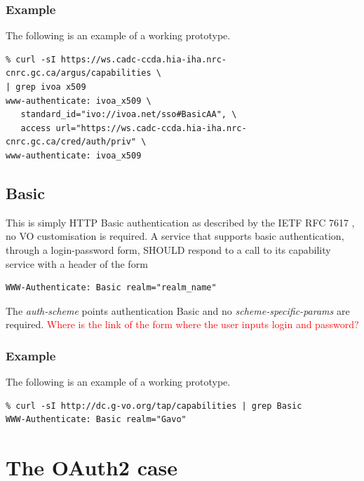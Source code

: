 \documentclass[11pt,a4paper]{ivoa}
\begin{document}
\subsubsection{Example}
The following is an example of a working prototype.
\begin{verbatim}
% curl -sI https://ws.cadc-ccda.hia-iha.nrc-cnrc.gc.ca/argus/capabilities \
| grep ivoa x509
www-authenticate: ivoa_x509 \
   standard_id="ivo://ivoa.net/sso#BasicAA", \ 
   access url="https://ws.cadc-ccda.hia-iha.nrc-cnrc.gc.ca/cred/auth/priv" \
www-authenticate: ivoa_x509
\end{verbatim}

\subsection{Basic}
This is simply HTTP Basic authentication as described by 
the IETF RFC 7617 \citep{rfc7617}, no VO customisation is 
required. A service that supports basic authentication, 
through a login-password form, SHOULD respond to a call 
to its capability service with a header of the form
\begin{verbatim}
WWW-Authenticate: Basic realm="realm_name"
\end{verbatim}
The \emph{auth-scheme} points authentication Basic and
no \emph{scheme-specific-params} are required.
\textcolor{red}{Where is the link of the form where the user inputs login and password?}


\subsubsection{Example}
The following is an example of a working prototype.
\begin{verbatim}
% curl -sI http://dc.g-vo.org/tap/capabilities | grep Basic
WWW-Authenticate: Basic realm="Gavo"
\end{verbatim}

\section{The OAuth2 case}
\end{document}
